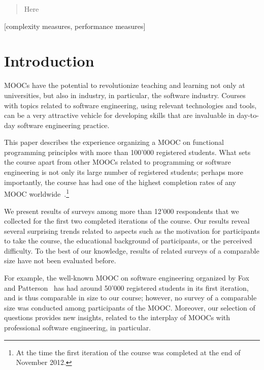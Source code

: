 \documentclass{sig-alternate}
\begin{document}
\maketitle
\begin{abstract}
Here
\end{abstract}

[complexity measures, performance measures]



\section{Introduction}

MOOCs have the potential to revolutionize teaching and learning not only at
universities, but also in industry, in particular, the software industry.
Courses with topics related to software engineering, using relevant
technologies and tools, can be a very attractive vehicle for developing skills
that are invaluable in day-to-day software engineering practice.

This paper describes the experience organizing a MOOC on functional
programming principles with more than 100'000 registered students. What sets
the course apart from other MOOCs related to programming or software
engineering is not only its large number of registered students; perhaps more
importantly, the course has had one of the highest completion rates of any
MOOC worldwide~\cite{Parr13}.\footnote{At the time the first iteration of the
course was completed at the end of November 2012.}

We present results of surveys among more than 12'000 respondents that we
collected for the first two completed iterations of the course. Our results
reveal several surprising trends related to aspects such as the motivation for
participants to take the course, the educational background of participants,
or the perceived difficulty. To the best of our knowledge, results of related
surveys of a comparable size have not been evaluated before.

For example, the well-known MOOC on software engineering organized by Fox and
Patterson~\cite{FoxP12} has had around 50'000 registered students in its first
iteration, and is thus comparable in size to our course; however, no survey of
a comparable size was conducted among participants of the MOOC. Moreover, our
selection of questions provides new insights, related to the interplay of
MOOCs with professional software engineering, in particular.
\end{document}
